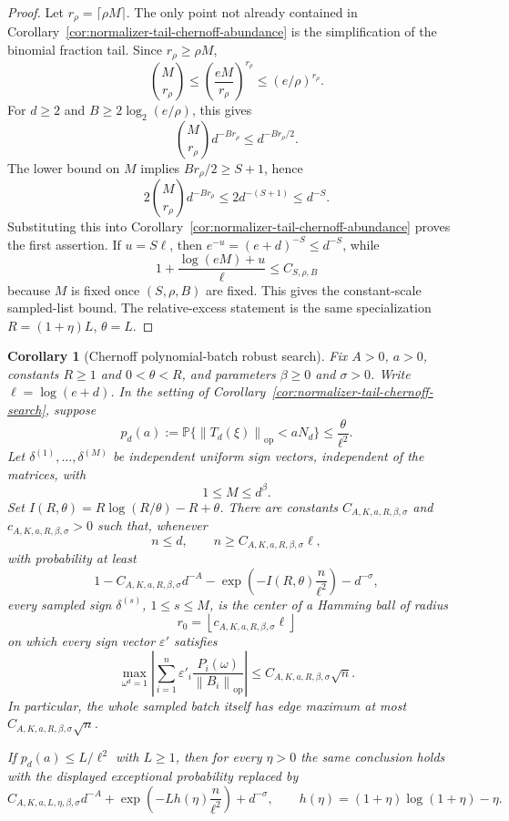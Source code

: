 \documentclass[11pt]{amsart}
\numberwithin{equation}{section}
\newtheorem{corollary}[theorem]{Corollary}
\theoremstyle{definition}
\theoremstyle{remark}
\newcommand{\op}{\mathrm{op}}
\newcommand{\Prob}{\mathbb P}
\newcommand{\norm}[1]{\left\lVert #1\right\rVert}
\newcommand{\eps}{\varepsilon}
\begin{document}
\begin{proof}
Let \(r_\rho=\lceil\rho M\rceil\).  The only point not already contained in
Corollary~\ref{cor:normalizer-tail-chernoff-abundance} is the simplification of
the binomial fraction tail.  Since \(r_\rho\ge\rho M\),
\[
  \binom{M}{r_\rho}\le \left(\frac{eM}{r_\rho}\right)^{r_\rho}
  \le (e/\rho)^{r_\rho}.
\]
For \(d\ge2\) and \(B\ge2\log_2(e/\rho)\), this gives
\[
  \binom{M}{r_\rho}d^{-B r_\rho}
  \le d^{-B r_\rho/2}.
\]
The lower bound on \(M\) implies \(B r_\rho/2\ge S+1\), hence
\[
  2\binom{M}{r_\rho}d^{-B r_\rho}\le 2d^{-(S+1)}\le d^{-S}.
\]
Substituting this into
Corollary~\ref{cor:normalizer-tail-chernoff-abundance} proves the first
assertion.  If \(u=S\ell\), then \(e^{-u}=(e+d)^{-S}\le d^{-S}\), while
\[
  1+\frac{\log(eM)+u}{\ell}
  \le C_{S,\rho,B}
\]
because \(M\) is fixed once \((S,\rho,B)\) are fixed.  This gives the
constant-scale sampled-list bound.  The relative-excess statement is the same
specialization \(R=(1+\eta)L\), \(\theta=L\).
\end{proof}

\begin{corollary}[Chernoff polynomial-batch robust search]
\label{cor:normalizer-tail-chernoff-poly-batch}
Fix \(A>0\), \(a>0\), constants \(R\ge1\) and \(0<\theta<R\), and parameters
\(\beta\ge0\) and \(\sigma>0\).  Write \(\ell=\log(e+d)\).  In the setting of
Corollary~\ref{cor:normalizer-tail-chernoff-search}, suppose
\[
  p_d(a):=\Prob\{\norm{T_d(\xi)}_{\op}<aN_d\}\le \frac{\theta}{\ell^2}.
\]
Let \(\delta^{(1)},\ldots,\delta^{(M)}\) be independent uniform sign vectors,
independent of the matrices, with
\[
  1\le M\le d^\beta .
\]
Set \(I(R,\theta)=R\log(R/\theta)-R+\theta\).  There are constants
\(C_{A,K,a,R,\beta,\sigma}\) and \(c_{A,K,a,R,\beta,\sigma}>0\) such that,
whenever
\[
  n\le d,\qquad n\ge C_{A,K,a,R,\beta,\sigma}\ell ,
\]
with probability at least
\[
  1-C_{A,K,a,R,\beta,\sigma}d^{-A}
  -\exp\left(-I(R,\theta)\frac n{\ell^2}\right)
  -d^{-\sigma},
\]
every sampled sign \(\delta^{(s)}\), \(1\le s\le M\), is the center of a
Hamming ball of radius
\[
  r_0=\left\lfloor c_{A,K,a,R,\beta,\sigma}\ell\right\rfloor
\]
on which every sign vector \(\eps'\) satisfies
\[
  \max_{\omega^d=1}\left|\sum_{i=1}^n
  \eps'_i\frac{P_i(\omega)}{\norm{B_i}_{\op}}\right|
  \le C_{A,K,a,R,\beta,\sigma}\sqrt n .
\]
In particular, the whole sampled batch itself has edge maximum at most
\(C_{A,K,a,R,\beta,\sigma}\sqrt n\).

If \(p_d(a)\le L/\ell^2\) with \(L\ge1\), then for every \(\eta>0\) the same
conclusion holds with the displayed exceptional probability replaced by
\[
  C_{A,K,a,L,\eta,\beta,\sigma}d^{-A}
  +\exp\left(-Lh(\eta)\frac n{\ell^2}\right)
  +d^{-\sigma},
  \qquad h(\eta)=(1+\eta)\log(1+\eta)-\eta .
\]
\end{corollary}
\end{document}
